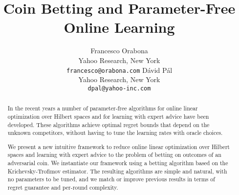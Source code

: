 \documentclass{article}
\author{
  Francesco Orabona\\
  Yahoo Research, New York\\
  \texttt{francesco@orabona.com}
  \And
  D\'avid P\'al\\
  Yahoo Research, New York\\
  \texttt{dpal@yahoo-inc.com}
}
\title{Coin Betting and Parameter-Free Online Learning}
\begin{document}
\maketitle

\begin{abstract}
In the recent years a number of parameter-free algorithms for online linear
optimization over Hilbert spaces and for learning with expert advice have been
developed. These algorithms achieve optimal regret bounds that depend on the
unknown competitors, without having to tune the learning rates with oracle
choices.

We present a new intuitive framework to reduce online linear optimization over Hilbert
spaces and learning with expert advice to the problem of betting on outcomes
of an adversarial coin. We instantiate our framework using a betting algorithm
based on the Krichevsky-Trofimov estimator.  The resulting algorithms are 
simple and natural, with no parameters to be tuned, and we match or improve
previous results in terms of regret guarantee and per-round complexity.
\end{abstract}












\begin{small}
\newpage
\setlength{\bibsep}{0pt}


\end{small}

\appendix





\end{document}
